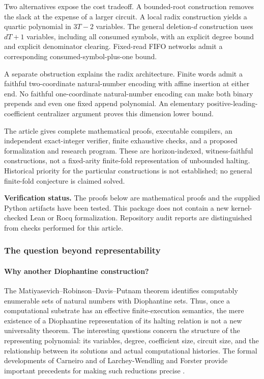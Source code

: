 \documentclass[11pt,a4paper]{article}
\theoremstyle{definition}
\theoremstyle{remark}
\begin{document}
Two alternatives expose the cost tradeoff. A bounded-root construction removes the slack at the expense of a larger circuit. A local radix construction yields a quartic polynomial in $3T-2$ variables. The general deletion-$d$ construction uses $dT+1$ variables, including all consumed symbols, with an explicit degree bound and explicit denominator clearing. Fixed-read FIFO networks admit a corresponding consumed-symbol-plus-one bound.

A separate obstruction explains the radix architecture. Finite words admit a faithful two-coordinate natural-number encoding with affine insertion at either end. No faithful one-coordinate natural-number encoding can make both binary prepends and even one fixed append polynomial. An elementary positive-leading-coefficient centralizer argument proves this dimension lower bound.

The article gives complete mathematical proofs, executable compilers, an independent exact-integer verifier, finite exhaustive checks, and a proposed formalization and research program. These are horizon-indexed, witness-faithful constructions, not a fixed-arity finite-fold representation of unbounded halting. Historical priority for the particular constructions is not established; no general finite-fold conjecture is claimed solved.


\noindent\textbf{Verification status.} The proofs below are mathematical proofs and the supplied Python artifacts have been tested. This package does not contain a new kernel-checked Lean or Rocq formalization. Repository audit reports are distinguished from checks performed for this article.

\subsubsection{The question beyond representability}
\paragraph{Why another Diophantine construction?}
The Matiyasevich--Robinson--Davis--Putnam theorem identifies computably enumerable sets of natural numbers with Diophantine sets. Thus, once a computational substrate has an effective finite-execution semantics, the mere existence of a Diophantine representation of its halting relation is not a new universality theorem. The interesting questions concern the structure of the representing polynomial: its variables, degree, coefficient size, circuit size, and the relationship between its solutions and actual computational histories. The formal developments of Carneiro and of Larchey-Wendling and Forster provide important precedents for making such reductions precise \cite{carneiro,lf2019}.
\end{document}
